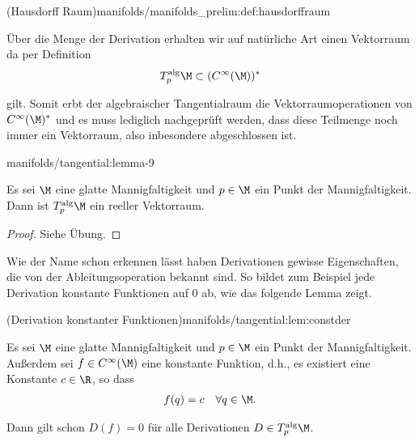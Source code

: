 \documentclass[letterpaper,10pt,english]{jupyterBook}
\begin{document}
\begin{definition}{(Hausdorff Raum)}{manifolds/manifolds_prelim:def:hausdorffraum}
\par
Über die Menge der Derivation erhalten wir auf natürliche Art einen Vektorraum da per Definition
\begin{align*}
T^{\text{alg}}_p\M \subset (C^\infty(\M))^\ast
\end{align*}
\par
gilt.
Somit erbt der algebraischer Tangentialraum die Vektorraumoperationen von \(C^\infty(\M)^\ast\) und es muss lediglich nachgeprüft werden, dass diese Teilmenge noch immer ein Vektorraum, also inbesondere abgeschlossen ist.
\begin{lemma}{}{manifolds/tangential:lemma-9}



\par
Es sei \(\M\) eine glatte Mannigfaltigkeit und \(p\in\M\) ein Punkt der Mannigfaltigkeit.
Dann ist \(T^{\text{alg}}_p\M\) ein reeller Vektorraum.
\end{lemma}

\begin{proof}
 Siehe Übung.
\end{proof}

\par
Wie der Name schon erkennen lässt haben Derivationen gewisse Eigenschaften, die von der Ableitungsoperation bekannt sind.
So bildet zum Beispiel jede Derivation konstante Funktionen auf \(0\) ab, wie das folgende Lemma zeigt.
\begin{lemma}{(Derivation konstanter Funktionen)}{manifolds/tangential:lem:constder}



\par
Es sei \(\M\) eine glatte Mannigfaltigkeit und \(p\in\M\) ein Punkt der Mannigfaltigkeit.
Außerdem sei \(f\in C^\infty(\M)\) eine konstante Funktion, d.h., es existiert eine Konstante \(c\in\R\), so dass
\begin{align*}
f(q) = c\quad\forall q\in\M.
\end{align*}
\par
Dann gilt schon \(D(f)=0\) für alle Derivationen \(D\in T^{\text{alg}}_p\M\).
\end{lemma}


\end{definition}
\end{document}

